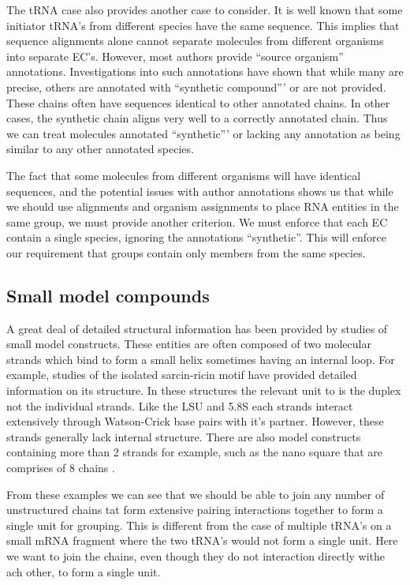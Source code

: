 The tRNA case also provides another case to consider. It is well known that some
initiator tRNA's from different species have the same sequence. This implies
that sequence alignments alone cannot separate molecules from different
organisms into separate EC's. However, most authors provide ``source organism''
annotations. Investigations into such annotations have shown that while many are
precise, others are annotated with ``synthetic compound''' or are not provided.
These chains often have sequences identical to other annotated chains. In other
cases, the synthetic chain aligns very well to a correctly annotated chain. Thus
we can treat molecules annotated ``synthetic''' or lacking any annotation as
being similar to any other annotated species.

The fact that some molecules from different organisms will have identical
sequences, and the potential issues with author annotations shows us that while
we should use alignments and organism assignments to place RNA entities in the
same group, we must provide another criterion. We must enforce that each EC
contain a single species, ignoring the annotations ``synthetic''. This will
enforce our requirement that groups contain only members from the same species.

\subsection{Small model compounds}

A great deal of detailed structural information has been provided by studies of
small model constructs. These entities are often composed of two molecular
strands which bind to form a small helix sometimes having an internal loop. For
example, studies of the isolated sarcin-ricin motif \cite{Olieric2009} have
provided detailed information on its structure. In these structures the relevant
unit to is the duplex not the individual strands. Like the LSU and 5.8S each
strands interact extensively through Watson-Crick base pairs with it's partner.
However, these strands generally lack internal structure. There are also model
constructs containing more than 2 strands for example, such as the nano square
that are comprises of 8 chains \cite{Dibrov2011a}.

From these examples we can see that we should be able to join any number of
unstructured chains tat form extensive pairing interactions together to form a
single unit for grouping. This is different from the case of multiple tRNA's on
a small mRNA fragment where the two tRNA's would not form a single unit. Here we
want to join the chains, even though they do not interaction directly withe ach
other, to form a single unit.

